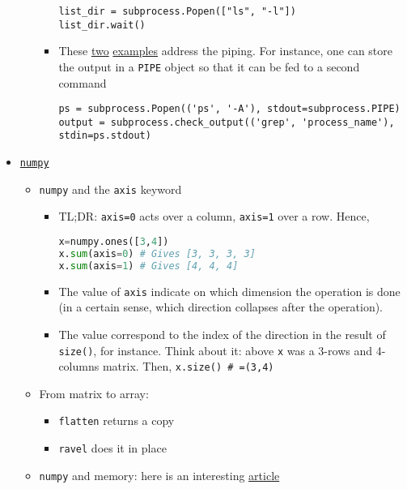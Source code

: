 \documentclass[a4paper,12pt,%
              final%
              ]{article}
\begin{document}
\begin{itemize}
\begin{itemize}
\begin{itemize}
\begin{verbatim}
list_dir = subprocess.Popen(["ls", "-l"])
list_dir.wait()
\end{verbatim}
          \item These \href{https://stackoverflow.com/questions/13332268/how-to-use-subprocess-command-with-pipes}{two} \href{https://stackoverflow.com/questions/295459/how-do-i-use-subprocess-popen-to-connect-multiple-processes-by-pipes}{examples} address the piping. For instance, one can store the output in a \texttt{PIPE} object so that it can be fed to a second command
\begin{verbatim}
ps = subprocess.Popen(('ps', '-A'), stdout=subprocess.PIPE)
output = subprocess.check_output(('grep', 'process_name'), stdin=ps.stdout)
\end{verbatim}
        \end{itemize}
    \end{itemize}
  \item \href{https://numpy.org/doc/stable/index.html}{\texttt{numpy}}
    \begin{itemize}
      \item \texttt{numpy} and the \texttt{axis} keyword
        \begin{itemize}
          \item TL;DR: \verb|axis=0| acts over a column, \verb|axis=1| over a row. Hence,
\begin{lstlisting}[language=python]
x=numpy.ones([3,4])
x.sum(axis=0) # Gives [3, 3, 3, 3]
x.sum(axis=1) # Gives [4, 4, 4]
\end{lstlisting}
          \item The value of \texttt{axis} indicate on which dimension the operation is done (in a certain sense, which direction collapses after the operation).
          \item The value correspond to the index of the direction in the result of \verb|size()|, for instance. Think about it: above \verb|x| was a 3-rows and 4-columns matrix. Then, \verb|x.size() # =(3,4)|
        \end{itemize}
      \item From matrix to array:
        \begin{itemize}
          \item \texttt{flatten} returns a copy
          \item \texttt{ravel} does it in place
        \end{itemize}
      \item \texttt{numpy} and memory: here is an interesting \href{https://pythonspeed.com/articles/numpy-memory-views/}{article}

\end{itemize}
\end{itemize}
\end{document}
